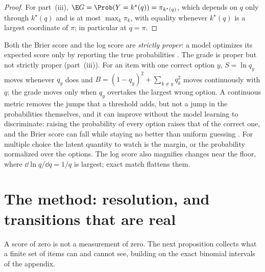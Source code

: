 \begin{refsection}
\begin{proof}
For part~(iii), $\E G=\Prob(Y=k^\star(q))=\pi_{k^\star(q)}$, which depends on $q$ only through $k^\star(q)$ and is at most $\max_k\pi_k$, with equality whenever $k^\star(q)$ is a largest coordinate of $\pi$; in particular at $q=\pi$.
\end{proof}

Both the Brier score and the log score are \emph{strictly proper}: a model optimizes its expected score only by reporting the true probabilities \parencite{GneitingRaftery2007}. The grade is proper but not strictly proper (part~(iii)). For an item with one correct option $y$, $S=\ln q_y$ moves whenever $q_y$ does and $B=(1-q_y)^2+\sum_{k\ne y}q_k^2$ moves continuously with $q$; the grade moves only when $q_y$ overtakes the largest wrong option. A continuous metric removes the jumps that a threshold adds, but not a jump in the probabilities themselves, and it can improve without the model learning to discriminate: raising the probability of every option raises that of the correct one, and the Brier score can fall while staying no better than uniform guessing \parencite{DuEtAl2024}. For multiple choice the latent quantity to watch is the margin, or the probability normalized over the options. The log score also magnifies changes near the floor, where $\dd\ln q/\dd q=1/q$ is largest; exact match flattens them.

\section{The method: resolution, and transitions that are real}\label{sec:emergence:resolution}

A score of zero is not a measurement of zero. The next proposition collects what a finite set of items can and cannot see, building on the exact binomial intervals of the appendix.


\end{refsection}
